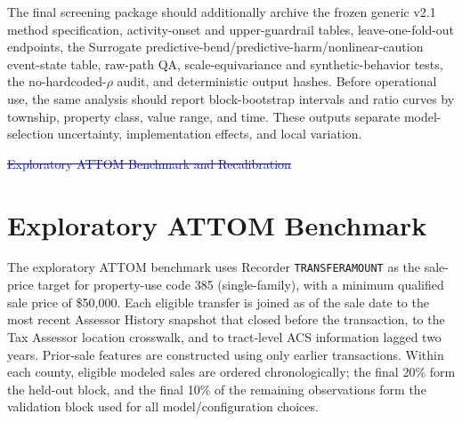 \documentclass[10pt]{article}
\theoremstyle{definition}
\newcommand{\1}{\mathbf{1}}
\newcommand{\oldtext}[1]{\textcolor{blue}{\sout{#1}}}
\newcommand{\newtext}[1]{\textcolor{impGreen}{#1}}
\newcommand{\latesttext}[1]{\textcolor{latestPurple}{#1}}
\begin{document}
\latesttext{The final screening package should additionally archive the frozen generic v2.1 method specification, activity-onset and upper-guardrail tables, leave-one-fold-out endpoints, the Surrogate predictive-bend/predictive-harm/nonlinear-caution event-state table, raw-path QA, scale-equivariance and synthetic-behavior tests, the no-hardcoded-$\rho$ audit, and deterministic output hashes.} Before operational use, the same analysis should report block-bootstrap intervals and ratio curves by township, property class, value range, and time. These outputs separate model-selection uncertainty, implementation effects, and local variation.

\oldtext{Exploratory ATTOM Benchmark and Recalibration}
\section{\newtext{Exploratory ATTOM Benchmark}}
\label{app:attom}


\newtext{The exploratory ATTOM benchmark uses Recorder \texttt{TRANSFERAMOUNT} as the sale-price target for property-use code 385 (single-family), with a minimum qualified sale price of \$50,000. Each eligible transfer is joined as of the sale date to the most recent Assessor History snapshot that closed before the transaction, to the Tax Assessor location crosswalk, and to tract-level ACS information lagged two years. Prior-sale features are constructed using only earlier transactions. Within each county, eligible modeled sales are ordered chronologically; the final 20\% form the held-out block, and the final 10\% of the remaining observations form the validation block used for all model/configuration choices.}
\end{document}
